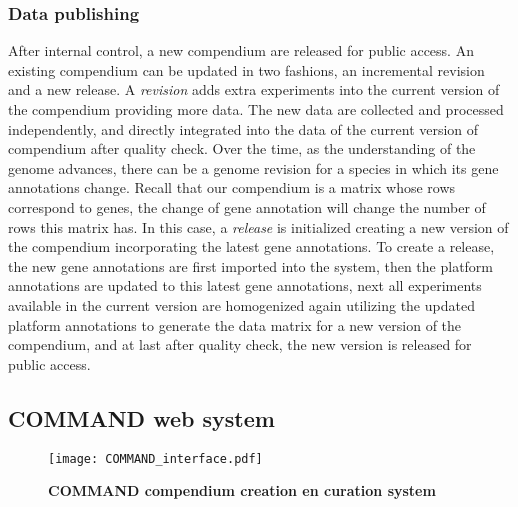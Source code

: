 \subsubsection{Data publishing}
%
After internal control, a new compendium are released for public access.
%
An existing compendium can be updated in two fashions, an incremental revision
and a new release.
%
A \textit{revision} adds extra experiments into the current version of the
compendium providing more data.
%
The new data are collected and processed independently, and directly
integrated into the data of the current version of compendium after quality
check.
%
Over the time, as the understanding of the genome advances, there can be a
genome revision for a species in which its gene annotations change.
%
Recall that our compendium is a matrix whose rows correspond to genes, the
change of gene annotation will change the number of rows this matrix has.
%
In this case, a \textit{release} is initialized creating a new version of the
compendium incorporating the latest gene annotations.
%
To create a release, the new gene annotations are first imported into the
system, then the platform annotations are updated to this latest gene
annotations, next all experiments available in the current version are
homogenized again utilizing the updated platform annotations to generate the
data matrix for a new version of the compendium, and at last after quality
check, the new version is released for public access.





\subsection{COMMAND web system}




\begin{figure}
  \centering
  \texttt{[image: COMMAND\_interface.pdf]}
  \caption[COMMAND compendium creation en curation system]{
    \textbf{COMMAND compendium creation en curation system}}
  \label{fig:command-interface}
\end{figure}

